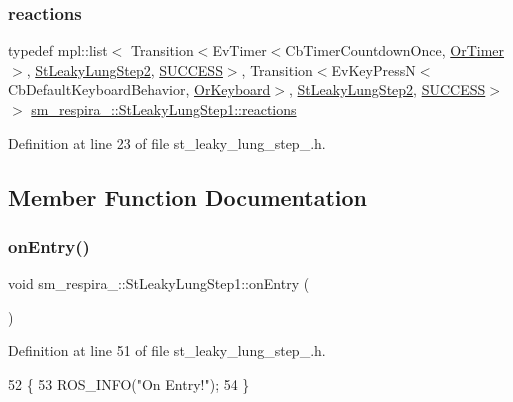 \subsubsection{\texorpdfstring{reactions}{reactions}}
{\footnotesize\ttfamily typedef mpl\+::list$<$ Transition$<$Ev\+Timer$<$Cb\+Timer\+Countdown\+Once, \hyperlink{classsm__respira__1_1_1OrTimer}{Or\+Timer}$>$, \hyperlink{structsm__respira__1_1_1StLeakyLungStep2}{St\+Leaky\+Lung\+Step2}, \hyperlink{classSUCCESS}{S\+U\+C\+C\+E\+SS}$>$, Transition$<$Ev\+Key\+PressN$<$Cb\+Default\+Keyboard\+Behavior, \hyperlink{classsm__respira__1_1_1OrKeyboard}{Or\+Keyboard}$>$, \hyperlink{structsm__respira__1_1_1StLeakyLungStep2}{St\+Leaky\+Lung\+Step2}, \hyperlink{classSUCCESS}{S\+U\+C\+C\+E\+SS}$>$ $>$ \hyperlink{structsm__respira__1_1_1StLeakyLungStep1_a952646a8bef57c53f04b06d0e74c1411}{sm\+\_\+respira\+\_\+::\+St\+Leaky\+Lung\+Step1\+::reactions}}



Definition at line 23 of file st\+\_\+leaky\+\_\+lung\+\_\+step\+\_.\+h.



\subsection{Member Function Documentation}
\mbox{\label{structsm__respira__1_1_1StLeakyLungStep1_aacb7c33d583b637b4f10164bad7e703c}} 
\subsubsection{\texorpdfstring{on\+Entry()}{onEntry()}}
{\footnotesize\ttfamily void sm\+\_\+respira\+\_\+::\+St\+Leaky\+Lung\+Step1\+::on\+Entry (\begin{DoxyParamCaption}{ }\end{DoxyParamCaption})\hspace{0.3cm}{\ttfamily [inline]}}



Definition at line 51 of file st\+\_\+leaky\+\_\+lung\+\_\+step\+\_.\+h.


\begin{DoxyCode}
52     \{
53         ROS\_INFO(\textcolor{stringliteral}{"On Entry!"});
54     \}
\end{DoxyCode}
\mbox{\label{structsm__respira__1_1_1StLeakyLungStep1_a240d20f059cbc41d8b85bf0ac699f1d1}} 
